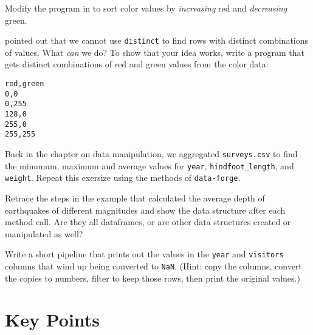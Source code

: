 
Modify the program in  to sort color values
by \emph{increasing} red and \emph{decreasing} green.


 pointed out that we cannot use \texttt{distinct}
to find rows with distinct combinations of values.
What \emph{can} we do?
To show that your idea works,
write a program that gets distinct combinations of red and green values from the color data:

\begin{verbatim}
red,green
0,0
0,255
128,0
255,0
255,255
\end{verbatim}


Back in the chapter on data manipulation,
we aggregated \texttt{surveys.csv} to find the minumum, maximum and average values 
for \texttt{year}, \texttt{hindfoot\_length}, and \texttt{weight}.
Repeat this exersize using the methods of \texttt{data-forge}.


Retrace the steps in the example that calculated
the average depth of earthquakes of different magnitudes
and show the data structure after each method call.
Are they all dataframes,
or are other data structures created or manipulated as well?


Write a short pipeline that prints out the values in the \texttt{year} and \texttt{visitors} columns
that wind up being converted to \texttt{NaN}.
(Hint: copy the columns, convert the copies to numbers, filter to keep those rows, then print the original values.)

\section*{Key Points}


